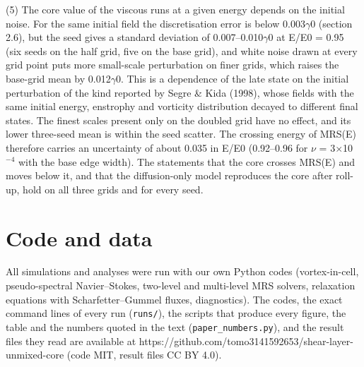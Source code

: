 \documentclass[11pt]{article}
\begin{document}
(5) The core value of the viscous runs at a given energy depends on the initial noise. For the same initial field the discretisation error is below 0.003$\gamma{}$0 (section 2.6), but the seed gives a standard deviation of 0.007--0.010$\gamma{}$0 at E/E0 = 0.95 (six seeds on the half grid, five on the base grid), and white noise drawn at every grid point puts more small-scale perturbation on finer grids, which raises the base-grid mean by 0.012$\gamma{}$0. This is a dependence of the late state on the initial perturbation of the kind reported by Segre \& Kida (1998), whose fields with the same initial energy, enstrophy and vorticity distribution decayed to different final states. The finest scales present only on the doubled grid have no effect, and its lower three-seed mean is within the seed scatter. The crossing energy of MRS(E) therefore carries an uncertainty of about 0.035 in E/E0 (0.92--0.96 for $\nu{}$ = 3$\times{}$10$^{-4}$ with the base edge width). The statements that the core crosses MRS(E) and moves below it, and that the diffusion-only model reproduces the core after roll-up, hold on all three grids and for every seed.

\section*{Code and data}
All simulations and analyses were run with our own Python codes (vortex-in-cell, pseudo-spectral Navier--Stokes, two-level and multi-level MRS solvers, relaxation equations with Scharfetter--Gummel fluxes, diagnostics). The codes, the exact command lines of every run (\texttt{runs/}), the scripts that produce every figure, the table and the numbers quoted in the text (\texttt{paper\_numbers.py}), and the result files they read are available at https://github.com/tomo3141592653/shear-layer-unmixed-core (code MIT, result files CC BY 4.0).
\end{document}
